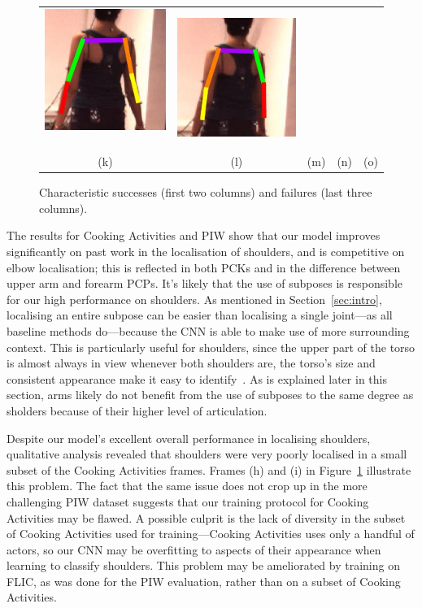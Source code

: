 \documentclass[runningheads]{llncs}
\begin{document}
\begin{figure}[t]
\begin{center}
\begin{tabular}{@{}c@{}c c@{}c@{}c@{}}
\includegraphics[width=0.19\linewidth]{figures/shots-cropped/h36m-s24f12-bad-flip-1.jpg}\,&
\includegraphics[width=0.19\linewidth]{figures/shots-cropped/h36m-s24f14-bad-flip-2.jpg}\\
(k) & (l) & (m) & (n) & (o)
\end{tabular}
\end{center}
\vspace{-5mm}
\caption{Characteristic successes (first two columns) and failures (last three
columns).}
\label{fig:qualitative}
\end{figure}

The results for Cooking Activities and PIW show that our model improves
significantly on past work in the localisation of shoulders, and is competitive
on elbow localisation; this is reflected in both PCKs and in the difference
between upper arm and forearm PCPs. It's likely that the use of subposes is
responsible for our high performance on shoulders. As mentioned in
Section~\ref{sec:intro}, localising an entire subpose can be easier than
localising a single joint---as all baseline methods do---because the CNN is
able to make use of more surrounding context. This is particularly useful for
shoulders, since the upper part of the torso is almost always in view whenever
both shoulders are, the torso's size and consistent appearance make it easy to
identify~\cite{mori2004recovering}. As is explained later in this section, arms
likely do not benefit from the use of subposes to the same degree as sholders
because of their higher level of articulation.

Despite our model's excellent overall performance in localising shoulders,
qualitative analysis revealed that shoulders were very poorly localised in a
small subset of the Cooking Activities frames. Frames (h) and (i) in
Figure~\ref{fig:qualitative} illustrate this problem. The fact that the same
issue does not crop up in the more challenging PIW dataset suggests that our
training protocol for Cooking Activities may be flawed. A possible culprit is
the lack of diversity in the subset of Cooking Activities used for
training---Cooking Activities uses only a handful of actors, so our CNN may be
overfitting to aspects of their appearance when learning to classify shoulders.
This problem may be ameliorated by training on FLIC, as was done for the PIW
evaluation, rather than on a subset of Cooking Activities.
\end{document}
